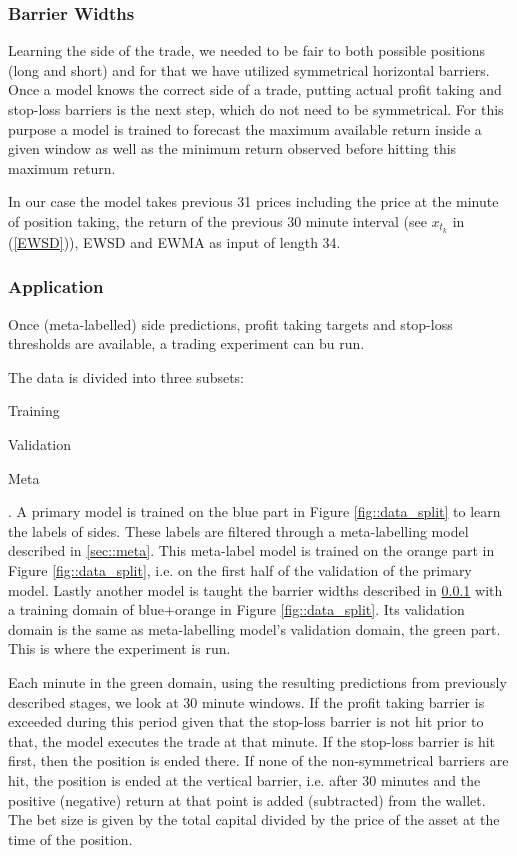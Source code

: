 \documentclass{article}
\begin{document}
\subsubsection{Barrier Widths}\label{sec::barr_widths}
Learning the side of the trade, we needed to be fair to both possible positions (long and short) and for that we have utilized symmetrical horizontal barriers. Once a model knows the correct side of a trade, putting actual profit taking and stop-loss barriers is the next step, which do not need to be symmetrical. For this purpose a model is trained to forecast the maximum available return inside a given window as well as the minimum return observed before hitting this maximum return.

In our case the model takes previous 31 prices including the price at the minute of position taking, the return of the previous 30 minute interval (see $x_{t_k}$ in (\ref{EWSD})), EWSD and EWMA as input of length 34.

\subsubsection{Application}\label{sec::application}
Once (meta-labelled) side predictions, profit taking targets and stop-loss thresholds are available, a trading experiment can bu run.

The data is divided into three subsets: 
\begin{enumerate*}
    \item Training
    \item Validation
    \item Meta
\end{enumerate*}.
A primary model is trained on the blue part in Figure \ref{fig::data_split} to learn the labels of sides. These labels are filtered through a meta-labelling model described in \ref{sec::meta}.
This meta-label model is trained on the orange part in Figure \ref{fig::data_split}, i.e. on the first half of the validation of the primary model. Lastly another model is taught the barrier widths described in \ref{sec::barr_widths} with a training domain of blue+orange in Figure \ref{fig::data_split}. Its validation domain is the same as meta-labelling model's validation domain, the green part. This is where the experiment is run.

Each minute in the green domain, using the resulting predictions from previously described stages, we look at 30 minute windows. If the profit taking barrier is exceeded during this period given that the stop-loss barrier is not hit prior to that, the model executes the trade at that minute. If the stop-loss barrier is hit first, then the position is ended there. If none of the non-symmetrical barriers are hit, the position is ended at the vertical barrier, i.e. after 30 minutes and the positive (negative) return at that point is added (subtracted) from the wallet. The bet size is given by the total capital divided by the price of the asset at the time of the position. 
\end{document}
